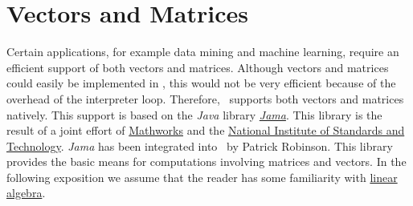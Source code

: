 \chapter{Vectors and Matrices \label{chapter:linear-algebra.tex}}
Certain applications, for example data mining and machine learning, require an efficient support of both
vectors and matrices. 
Although vectors and matrices could easily be implemented in \setlx, this would not be very
efficient because of the overhead of the interpreter loop.  Therefore, \setlx\ supports both vectors and
matrices natively.  This support is based on the \textsl{Java} library 
\href{http://math.nist.gov/javanumerics/jama/}{\textsl{Jama}}.  This library is the result of a joint effort of
\href{http://www.mathworks.com/}{Mathworks} and the \href{https://www.nist.gov}{National Institute
  of Standards and Technology}.  \textsl{Jama} has been integrated into  
\setlx\ by Patrick Robinson.  This library provides the basic means for computations involving
matrices and vectors.  In the following exposition we assume that the reader has some familiarity with  
\href{http://en.wikipedia.org/wiki/Linear_algebra}{linear algebra}.

